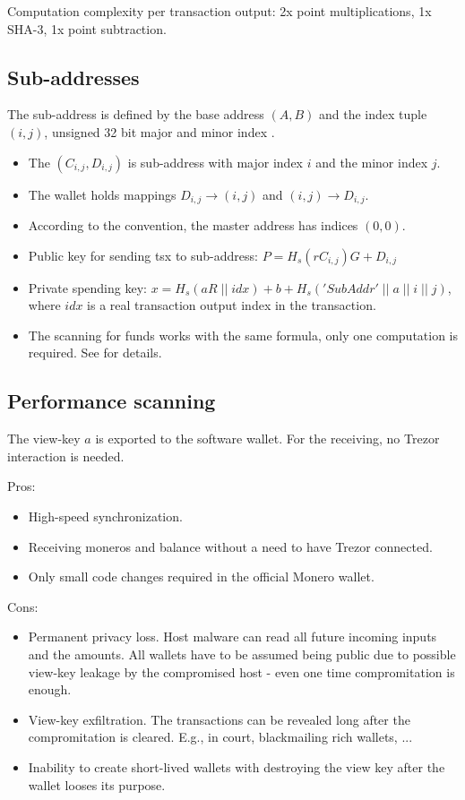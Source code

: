 \documentclass[]{article}
\begin{document}
Computation complexity per transaction output: 2x point multiplications, 1x SHA-3, 1x point subtraction.

\subsection{Sub-addresses}
The sub-address is defined by the base address $(A,B)$ and the index tuple $(i,j)$, unsigned 32 bit major and minor index \cite{mrl_006_subaddr}.

\begin{itemize}
	\item The $(C_{i,j}, D_{i,j})$ is sub-address with major index $i$ and the minor index $j$.
	
	\item  The wallet holds mappings $D_{i,j} \rightarrow (i, j)$ and $(i, j) \rightarrow D_{i,j}$. 
	
	\item According to the convention, the master address has indices $(0, 0)$.
	
	\item Public key for sending tsx to sub-address: $P = H_s(rC_{i,j})G + D_{i,j}$
	
	\item Private spending key: $x = H_s(aR \; || \; idx) + b + H_s('SubAddr' \; || \; a \; || \; i \; || \; j)$, where $idx$ is a real transaction output index in the transaction.
	
	\item The scanning for funds works with the same formula, only one computation is required. See \cite{mrl_006_subaddr} for details.
\end{itemize}

\subsection{Performance scanning} 
The view-key $a$ is exported to the software wallet. For the receiving, no Trezor interaction is needed. 

\noindent Pros:
\begin{itemize}
	\item High-speed synchronization.
	\item Receiving moneros and balance without a need to have Trezor connected.
	\item Only small code changes required in the official Monero wallet.
\end{itemize}

\noindent Cons:
\begin{itemize}
	\item Permanent privacy loss. Host malware can read all future incoming inputs and the amounts. All wallets have to be assumed being public due to possible view-key leakage by the compromised host - even one time compromitation is enough.
	\item View-key exfiltration. The transactions can be revealed long after the compromitation is cleared. E.g., in court, blackmailing rich wallets, ...
	\item Inability to create short-lived wallets with destroying the view key after the wallet looses its purpose. 
\end{itemize}
\end{document}

